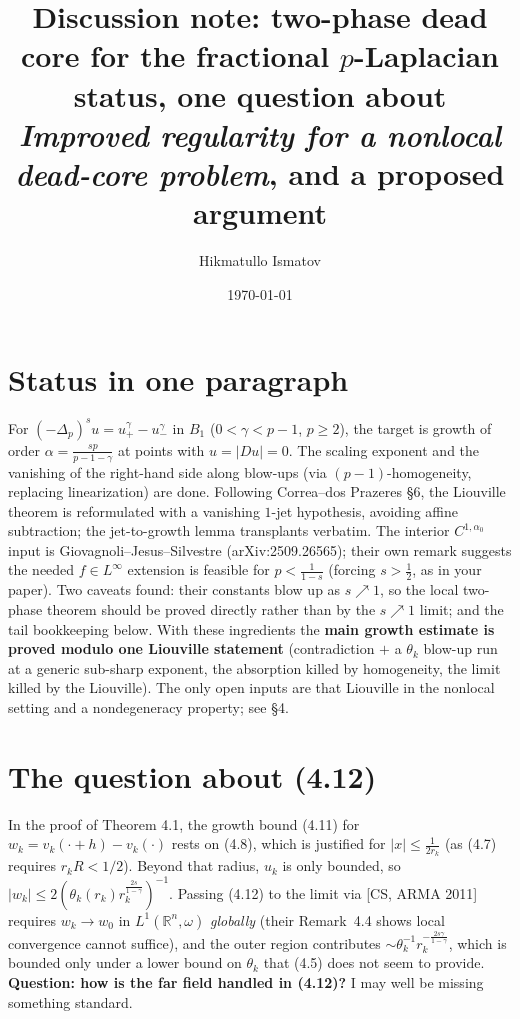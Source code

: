 \documentclass[11pt]{amsart}
\title[Discussion note]{Discussion note: two-phase dead core for the
fractional $p$-Laplacian\\ \large status, one question about
\emph{Improved regularity for a nonlocal dead-core problem}, and a proposed argument}
\author{Hikmatullo Ismatov}
\date{\today}
\newcommand{\R}{\mathbb{R}}
\newcommand{\fpl}[1]{(-\Delta_p)^{s}#1}
\newcommand{\al}{\alpha}
\begin{document}
\maketitle

\section{Status in one paragraph}
For $\fpl{u}=u_+^{\gamma}-u_-^{\gamma}$ in $B_1$ ($0<\gamma<p-1$,
$p\ge2$), the target is growth of order $\al=\frac{sp}{p-1-\gamma}$ at
points with $u=|Du|=0$. The scaling exponent and the vanishing of the
right-hand side along blow-ups (via $(p-1)$-homogeneity, replacing
linearization) are done. Following Correa--dos Prazeres \S6, the
Liouville theorem is reformulated with a vanishing $1$-jet hypothesis,
avoiding affine subtraction; the jet-to-growth lemma transplants
verbatim. The interior $C^{1,\al_0}$ input is
Giovagnoli--Jesus--Silvestre (arXiv:2509.26565); their own remark
suggests the needed $f\in L^\infty$ extension is feasible for
$p<\frac{1}{1-s}$ (forcing $s>\frac12$, as in your paper). Two
caveats found: their constants blow up as $s\nearrow1$, so the local
two-phase theorem should be proved directly rather than by the
$s\nearrow1$ limit; and the tail bookkeeping below. With these ingredients
the \textbf{main growth estimate is proved modulo one Liouville statement}
(contradiction $+$ a $\theta_k$ blow-up run at a generic sub-sharp
exponent, the absorption killed by homogeneity, the limit killed by the
Liouville). The only open inputs are that Liouville in the nonlocal
setting and a nondegeneracy property; see \S4.

\section{The question about (4.12)}
In the proof of Theorem 4.1, the growth bound (4.11) for
$w_k=v_k(\cdot+h)-v_k(\cdot)$ rests on (4.8), which is justified for
$|x|\le\frac{1}{2r_k}$ (as (4.7) requires $r_kR<1/2$). Beyond that
radius, $u_k$ is only bounded, so $|w_k|\le 2(\theta_k(r_k)
r_k^{\frac{2s}{1-\gamma}})^{-1}$. Passing (4.12) to the limit via
[CS, ARMA 2011] requires $w_k\to w_0$ in $L^1(\R^n,\omega)$
\emph{globally} (their Remark~4.4 shows local convergence cannot
suffice), and the outer region contributes
$\sim\theta_k^{-1}r_k^{-\frac{2s\gamma}{1-\gamma}}$, which is bounded
only under a lower bound on $\theta_k$ that (4.5) does not seem to
provide. \textbf{Question: how is the far field handled in (4.12)?}
I may well be missing something standard.
\end{document}
